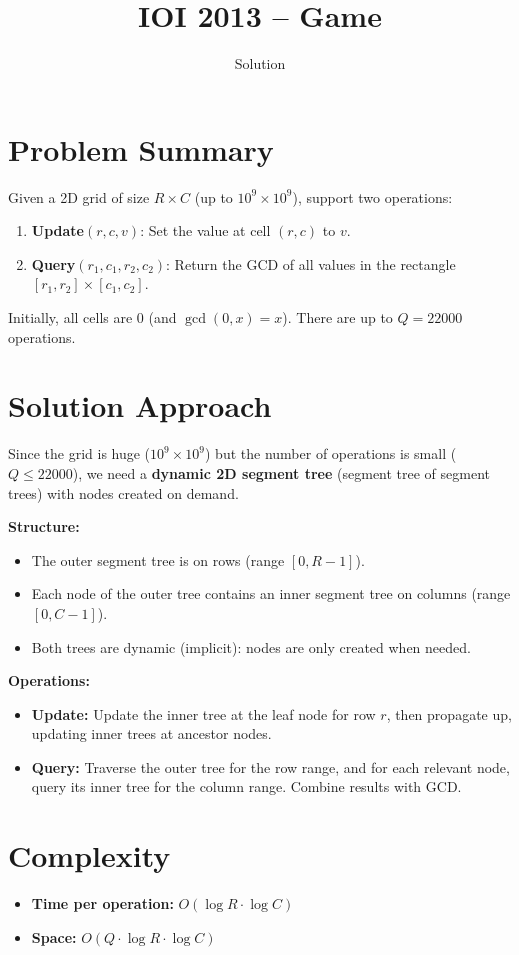 \documentclass[11pt,a4paper]{article}
\title{IOI 2013 -- Game}
\author{Solution}
\date{}
\begin{document}
\maketitle

\section{Problem Summary}
Given a 2D grid of size $R \times C$ (up to $10^9 \times 10^9$), support two operations:
\begin{enumerate}
    \item \textbf{Update}$(r, c, v)$: Set the value at cell $(r, c)$ to $v$.
    \item \textbf{Query}$(r_1, c_1, r_2, c_2)$: Return the GCD of all values in the rectangle $[r_1, r_2] \times [c_1, c_2]$.
\end{enumerate}

Initially, all cells are 0 (and $\gcd(0, x) = x$). There are up to $Q = 22000$ operations.

\section{Solution Approach}
Since the grid is huge ($10^9 \times 10^9$) but the number of operations is small ($Q \leq 22000$), we need a \textbf{dynamic 2D segment tree} (segment tree of segment trees) with nodes created on demand.

\textbf{Structure:}
\begin{itemize}
    \item The outer segment tree is on rows (range $[0, R-1]$).
    \item Each node of the outer tree contains an inner segment tree on columns (range $[0, C-1]$).
    \item Both trees are dynamic (implicit): nodes are only created when needed.
\end{itemize}

\textbf{Operations:}
\begin{itemize}
    \item \textbf{Update:} Update the inner tree at the leaf node for row $r$, then propagate up, updating inner trees at ancestor nodes.
    \item \textbf{Query:} Traverse the outer tree for the row range, and for each relevant node, query its inner tree for the column range. Combine results with GCD.
\end{itemize}

\section{Complexity}
\begin{itemize}
    \item \textbf{Time per operation:} $O(\log R \cdot \log C)$
    \item \textbf{Space:} $O(Q \cdot \log R \cdot \log C)$
\end{itemize}
\end{document}
